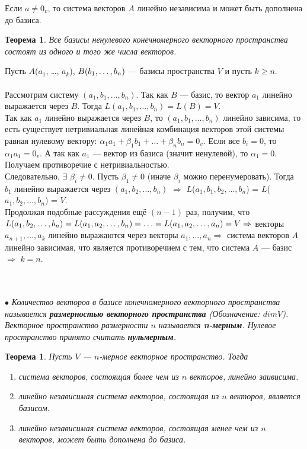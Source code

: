\begin{Proof}
	Если $a \neq 0_v$, то система векторов $A$ линейно независима и может быть дополнена до базиса.
\end{Proof}
\newtheorem*{Th2*}{Теорема}\begin{Th2*} Все базисы ненулевого конечномерного векторного пространства состоят из одного и того же числа векторов. \end{Th2*}
\begin{Proof}
	Пусть $A$($a_1$, \dots, $a_k$), $B(b_1,\dots,b_n)$ --- базисы пространства $V$ и пусть $k\geqslant n$.\\\\
	Рассмотрим систему $(a_1, b_1, \dots, b_n)$. Так как $B$ --- базис, то вектор $a_1$ линейно выражается через $B$. Тогда $L(a_1, b_1, \dots, b_n) = L(B) = V$.\\
	Так как $a_1$ линейно выражается через $B$, то $(a_1, b_1, \dots, b_n)$ линейно зависима, то есть существует нетривиальная линейная комбинация векторов этой системы равная нулевому вектору: $\alpha_1a_1 + \beta_1b_1 + \ldots + \beta_n b_n = 0_v$. Если все $b_i = 0$, то $\alpha_1a_1 = 0_v$. А так как $a_1$ --- вектор из базиса (значит ненулевой), то $\alpha_1 = 0$. Получаем противоречие с нетривиальностью.\\
	Следовательно, $\exists$ $\beta_i \neq 0$. Пусть $\beta_1 \neq 0$ (иначе $\beta_i$ можно перенумеровать). Тогда $b_1$ линейно выражается через $(a_1,b_2,\dots, b_n)$ $\Rightarrow$ $L$($a_1, b_1, b_2, \dots, b_n$) = $L$($a_1, b_2, \dots, b_n$) = $V$.\\
	Продолжая подобные рассуждения ещё $(n-1)$ раз, получим, что $L(a_1, b_2, \dots, b_n) =\\ L(a_1, a_2, \dots, b_n) = \ldots = L(a_1, a_2, \dots, a_n) = V\Rightarrow$ векторы $a_{n+1}, \dots, a_k$ линейно выражаются через векторы $a_1, \dots, a_n \Rightarrow$ система векторов $A$ линейно зависимая, что является противоречием с тем, что система $A$ --- базис $\Rightarrow$ $k = n.$
\end{Proof}\\\\
$\bullet$ \textit{Количество векторов в базисе конечномерного векторного пространства называется \textbf{размерностью векторного пространства} (Обозначение: $dimV$). Векторное пространство размерности $n$ называется \textbf{n-мерным}. Нулевое пространство принято считать \textbf{нульмерным}.}
\newtheorem*{Th4*}{Теорема}\begin{Th4*} Пусть $V$ --- $n$-мерное векторное пространство. Тогда\begin{enumerate}
		\item система векторов, состоящая более чем из $n$ векторов, линейно заивисима.
		\item линейно независимая система векторов, состоящая из $n$ векторов, является базисом.
		\item линейно независимая система векторов, состоящая менее чем из $n$ векторов, может быть дополнена до базиса.
\end{enumerate} \end{Th4*}
